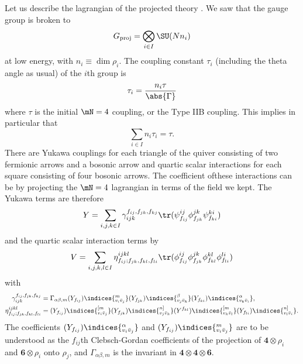 \documentclass{worksheetclass}
\begin{document}
    Let us describe the lagrangian of the projected theory \cite{vafa1998}. We saw that the gauge group is broken to 
    \begin{equation}
        G_{\text{proj}}=\bigotimes_{i\in I}\SU(N n_i)
    \end{equation}
    at low energy, with $n_i\equiv\dim\rho_i$. The coupling constant $\tau_i$ (including the theta angle as usual) of the $i$th group is
    \begin{equation}
        \tau_i=\frac{n_i\tau}{\abs{\Gamma}}
    \end{equation}
    where $\tau$ is the initial $\mN=4$ coupling, or the Type IIB coupling. This implies in particular that
    \begin{equation}
        \sum_{i\in I}n_i\tau_i=\tau.
    \end{equation}
    There are Yukawa couplings for each triangle of the quiver consisting of two fermionic arrows and a bosonic arrow and quartic scalar interactions for each square consisting of four bosonic arrows. The coefficient ofthese interactions can be by projecting the $\mN=4$ lagrangian in terms of the field we kept. The Yukawa terms are therefore
    \begin{equation}
        Y=\sum_{i,j,k\in I}\gamma^{f_{ij},f_{jk},f_{kj}}_{ijk}\tr(\psi^{ij}_{f_{ij}}\phi^{jk}_{f_{jk}}\psi^{ki}_{f_{ki}})
    \end{equation}
    and the quartic scalar interaction terms by
    \begin{equation}
        V=\sum_{i,j,k,l\in I}\eta^{ijkl}_{f_{ij};f_{jk},f_{kl},f_{li}}\tr(\phi^{ij}_{f_{ij}}\phi^{jk}_{f_{jk}}\phi^{kl}_{f_{kl}}\phi^{li}_{f_{li}})
    \end{equation}
    with
    \begin{align}
        \gamma^{f_{ij},f_{jk},f_{kj}}_{ijk} &= \Gamma_{\alpha\beta,m}(Y_{f_{ij}})\indices{^m_{v_i\bar{v}_j}}(Y_{f_{jk}})\indices{^\beta_{v_j\bar{v}_k}}(Y_{f_{ki}})\indices{^\alpha_{v_k\bar{v}_i}}, \\
        \eta^{ijkl}_{f_{ij};f_{jk},f_{kl},f_{li}} &= (Y_{f_{ij}})\indices{^{[m}_{v_i\bar{v}_j}}(Y_{f_{jk}})\indices{^{n]}_{v_j\bar{v}_k}}(Y^{f_{kl}})\indices{^{[m}_{v_k\bar{v}_l}}(Y_{f_{li}})\indices{^{n]}_{v_l\bar{v}_i}}.
    \end{align}
    The coefficients $(Y_{f_{ij}})\indices{^\alpha_{v_i\bar{v}_j}}$ and $(Y_{f_{ij}})\indices{^m_{v_i\bar{v}_j}}$ are to be understood as the $f_{ij}$th Clebsch-Gordan coefficients of the projection of $\boldsymbol{4}\otimes\rho_i$ and $\boldsymbol{6}\otimes\rho_i$ onto $\rho_j$, and $\Gamma_{\alpha\beta,m}$ is the invariant in $\boldsymbol{4}\otimes\boldsymbol{4}\otimes\boldsymbol{6}$.
\end{document}
